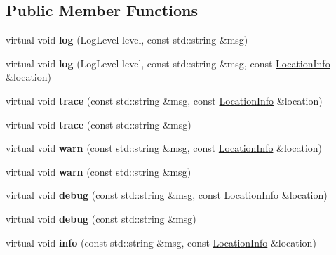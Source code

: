 \subsection*{Public Member Functions}
\begin{DoxyCompactItemize}
\item 
\mbox{\label{classLogger_a462b652a4b4f70cdda54de7d3ef3b8fa}} 
virtual void {\bfseries log} (Log\+Level level, const std\+::string \&msg)
\item 
\mbox{\label{classLogger_a6a1c507f7df2c9e3f17ec95b77b15029}} 
virtual void {\bfseries log} (Log\+Level level, const std\+::string \&msg, const \hyperlink{classLocationInfo}{Location\+Info} \&location)
\item 
\mbox{\label{classLogger_ad5f26194f150923a6e293e94abf36bb8}} 
virtual void {\bfseries trace} (const std\+::string \&msg, const \hyperlink{classLocationInfo}{Location\+Info} \&location)
\item 
\mbox{\label{classLogger_a5b750a601130ffd23ed683df07d3d73e}} 
virtual void {\bfseries trace} (const std\+::string \&msg)
\item 
\mbox{\label{classLogger_a27b5a47d28a4ce96685ecc0edf2e4857}} 
virtual void {\bfseries warn} (const std\+::string \&msg, const \hyperlink{classLocationInfo}{Location\+Info} \&location)
\item 
\mbox{\label{classLogger_a5f0e4956547ad72dd11592cd6b1b17c4}} 
virtual void {\bfseries warn} (const std\+::string \&msg)
\item 
\mbox{\label{classLogger_a277e502ec4cce055217013b5aefafa6b}} 
virtual void {\bfseries debug} (const std\+::string \&msg, const \hyperlink{classLocationInfo}{Location\+Info} \&location)
\item 
\mbox{\label{classLogger_a11c84c1df604ada356f4cea403c8e8f2}} 
virtual void {\bfseries debug} (const std\+::string \&msg)
\item 
\mbox{\label{classLogger_a0657cfd773c45ffe2ce17bb6c1a8fecf}} 
virtual void {\bfseries info} (const std\+::string \&msg, const \hyperlink{classLocationInfo}{Location\+Info} \&location)

\end{DoxyCompactItemize}
